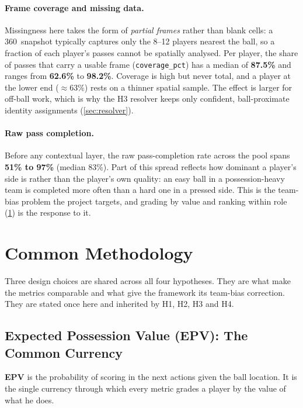 \documentclass[12pt,a4paper]{article}
\begin{document}
\paragraph{Frame coverage and missing data.} Missingness here takes the form of \emph{partial frames} rather than blank cells: a 360~snapshot typically captures only the 8--12 players nearest the ball, so a fraction of each player's passes cannot be spatially analysed. Per player, the share of passes that carry a usable frame (\texttt{coverage\_pct}) has a median of \textbf{87.5\%} and ranges from \textbf{62.6\%} to \textbf{98.2\%}. Coverage is high but never total, and a player at the lower end ($\approx 63\%$) rests on a thinner spatial sample. The effect is larger for off-ball work, which is why the H3 resolver keeps only confident, ball-proximate identity assignments (\cref{sec:resolver}).

\paragraph{Raw pass completion.} Before any contextual layer, the raw pass-completion rate across the pool spans \textbf{51\% to 97\%} (median 83\%). Part of this spread reflects how dominant a player's side is rather than the player's own quality: an easy ball in a possession-heavy team is completed more often than a hard one in a pressed side. This is the team-bias problem the project targets, and grading by value and ranking within role (\cref{sec:common}) is the response to it.

\clearpage
\section{Common Methodology}\label{sec:common}

Three design choices are shared across all four hypotheses.
They are what make the metrics comparable and what give the framework its team-bias correction.
They are stated once here and inherited by H1, H2, H3 and H4.

\subsection{Expected Possession Value (EPV): The Common Currency}\label{sec:epv}

\textbf{EPV} is the probability of scoring in the next actions given the ball location.
It is the single currency through which every metric grades a player by the value of what he does.
\end{document}
